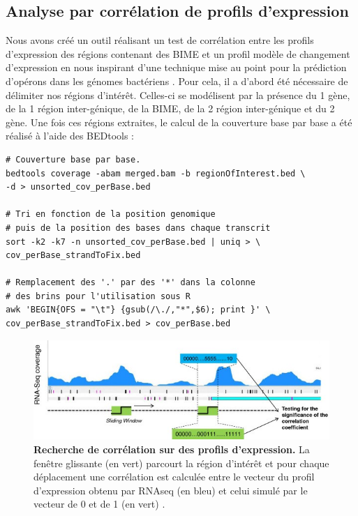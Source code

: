 \documentclass[12pt,a4paper]{report}
\begin{document}
\begin{onehalfspace}
\subsection*{Analyse par corrélation de profils d'expression}
Nous avons créé un outil réalisant un test de corrélation entre les profils d'expression des régions contenant des BIME et un profil modèle de changement d'expression en nous inspirant d'une technique mise au point pour la prédiction d'opérons dans les génomes bactériens \citep{Fortino2014}. Pour cela, il a d'abord été nécessaire de délimiter nos régions d'intérêt. Celles-ci se modélisent par la présence du 1 gène, de la 1 région inter-génique, de la BIME, de la 2 région inter-génique et du 2 gène. Une fois ces régions extraites, le calcul de la couverture base par base a été réalisé à l'aide des BEDtools :
\begin{lstlisting}[frame=single]
# Couverture base par base.
bedtools coverage -abam merged.bam -b regionOfInterest.bed \
-d > unsorted_cov_perBase.bed

# Tri en fonction de la position genomique 
# puis de la position des bases dans chaque transcrit
sort -k2 -k7 -n unsorted_cov_perBase.bed | uniq > \
cov_perBase_strandToFix.bed

# Remplacement des '.' par des '*' dans la colonne
# des brins pour l'utilisation sous R
awk 'BEGIN{OFS = "\t"} {gsub(/\./,"*",$6); print }' \
cov_perBase_strandToFix.bed > cov_perBase.bed
\end{lstlisting}

\begin{figure}[ht]
\centerline{\includegraphics[scale=0.6]{figures/profil.jpg}}
\caption{\textbf{Recherche de corrélation sur des profils d'expression.} La fenêtre glissante (en vert) parcourt la région d'intérêt et pour chaque déplacement une corrélation est calculée entre le vecteur du profil d'expression obtenu par RNAseq (en bleu) et celui simulé par le vecteur de 0 et de 1 (en vert) \citep{Fortino2014}.}
\label{fig:profil} 
\end{figure}


\end{onehalfspace}
\end{document}
